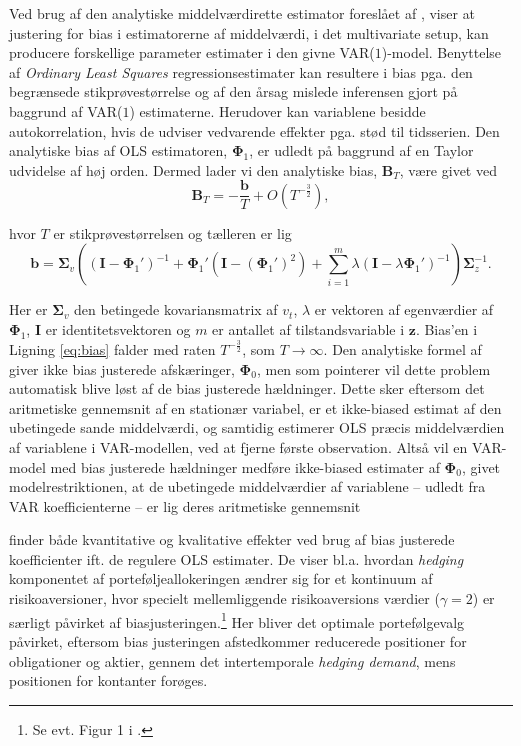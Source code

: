 \documentclass[
  a4paper,
  oneside]{memoir}
\begin{document}
Ved brug af den analytiske middelværdirette estimator foreslået af \citep{Pope1990}, viser \citep{Engsted2012} at justering for bias i estimatorerne af middelværdi, i det multivariate setup, kan producere forskellige parameter estimater i den givne VAR(\(1\))-model. Benyttelse af \emph{Ordinary Least Squares} regressionsestimater kan resultere i bias pga. den begrænsede stikprøvestørrelse og af den årsag mislede inferensen gjort på baggrund af VAR(\(1\)) estimaterne. Herudover kan variablene besidde autokorrelation, hvis de udviser vedvarende effekter pga. stød til tidsserien. Den analytiske bias af OLS estimatoren, \(\bm{\Phi}_1\), er udledt på baggrund af en Taylor udvidelse af høj orden. Dermed lader vi den analytiske bias, \(\bm{B}_T\), være givet ved
\begin{equation}
\bm{B}_T=-\frac{\bm{b}}{T}+ O\left(T^{-\frac{3}{2}}\right), \label{eq:bias}
\end{equation}

hvor \(T\) er stikprøvestørrelsen og tælleren er lig
\[\bm{b}=\bm{\Sigma}_v\left(\left(\bm{I}-\bm{\Phi}_1'\right)^{-1}+\bm{\Phi}_1'\left(\bm{I}-\left(\bm{\Phi}_1'\right)^2\right)+\sum_{i=1}^m \lambda \left(\bm{I}-\lambda\bm{\Phi}_1'\right)^{-1}\right)\bm{\Sigma}_z^{-1}.\]

Her er \(\bm{\Sigma}_v\) den betingede kovariansmatrix af \(v_t\), \(\lambda\) er vektoren af egenværdier af \(\bm{\Phi}_1\), \(\bm{I}\) er identitetsvektoren og \(m\) er antallet af tilstandsvariable i \(\bm{z}\). Bias'en i Ligning \eqref{eq:bias} falder med raten \(T^{-\frac{3}{2}}\), som \(T\rightarrow \infty\). Den analytiske formel af \citep{Pope1990} giver ikke bias justerede afskæringer, \(\bm{\Phi}_0\), men som \citep{Engsted2012} pointerer vil dette problem automatisk blive løst af de bias justerede hældninger. Dette sker eftersom det aritmetiske gennemsnit af en stationær variabel, er et ikke-biased estimat af den ubetingede sande middelværdi, og samtidig estimerer OLS præcis middelværdien af variablene i VAR-modellen, ved at fjerne første observation. Altså vil en VAR-model med bias justerede hældninger medføre ikke-biased estimater af \(\bm{\Phi}_0\), givet modelrestriktionen, at de ubetingede middelværdier af variablene -- udledt fra VAR koefficienterne -- er lig deres aritmetiske gennemsnit

\citep{Engsted2012} finder både kvantitative og kvalitative effekter ved brug af bias justerede koefficienter ift. de regulere OLS estimater. De viser bl.a. hvordan \emph{hedging} komponentet af porteføljeallokeringen ændrer sig for et kontinuum af risikoaversioner, hvor specielt mellemliggende risikoaversions værdier (\(\gamma=2\)) er særligt påvirket af biasjusteringen.\footnote{Se evt. Figur 1 i \citep{Engsted2012}.} Her bliver det optimale portefølgevalg påvirket, eftersom bias justeringen afstedkommer reducerede positioner for obligationer og aktier, gennem det intertemporale \emph{hedging demand}, mens positionen for kontanter forøges.
\end{document}
